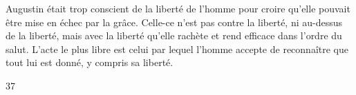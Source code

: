 Augustin était trop conscient de la liberté de l'homme pour croire qu'elle pouvait être mise en échec par la grâce. Celle-ce n'est pas contre la liberté, ni au-dessus de la liberté, mais avec la liberté qu'elle rachète et rend efficace dans l'ordre du salut. L'acte le plus libre est celui par lequel l'homme accepte de reconnaître que tout lui est donné, y compris sa liberté.
 
























37
